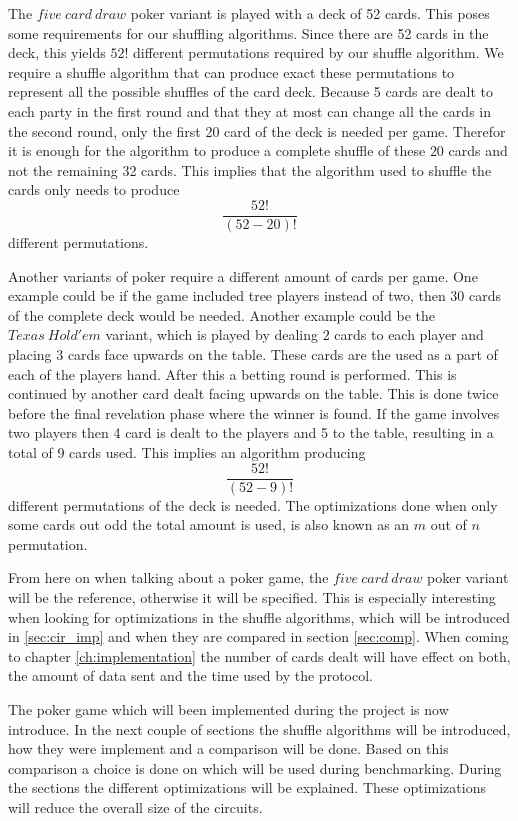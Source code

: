 \documentclass[twoside,11pt,openright]{report}
\begin{document}
The $five~card~draw$ poker variant is played with a deck of 52 cards. This poses some requirements for our shuffling algorithms. Since there are 52 cards in the deck, this yields $52!$ different permutations required by our shuffle algorithm. We require a shuffle algorithm that can produce exact these permutations to represent all the possible shuffles of the card deck. Because 5 cards are dealt to each party in the first round and that they at most can change all the cards in the second round, only the first 20 card of the deck is needed per game. Therefor it is enough for the algorithm to produce a complete shuffle of these $20$ cards and not the remaining 32 cards. This implies that the algorithm used to shuffle the cards only needs to produce $$\frac{52!}{(52-20)!}$$ different permutations. 

Another variants of poker require a different amount of cards per game. One example could be if the game included tree players instead of two, then 30 cards of the complete deck would be needed. Another example could be the $Texas~Hold'em$ variant, which is played by dealing $2$ cards to each player and placing $3$ cards face upwards on the table. These cards are the used as a part of each of the players hand. After this a betting round is performed. This is continued by another card dealt facing upwards on the table. This is done twice before the final revelation phase where the winner is found. If the game involves two players then 4 card is dealt to the players and 5 to the table, resulting in a total of 9 cards used. This implies an algorithm producing $$\frac{52!}{(52-9)!}$$ different permutations of the deck is needed. The optimizations done when only some cards out odd the total amount is used, is also known as an $m$ out of $n$ permutation.

From here on when talking about a poker game, the $five~card~draw$ poker variant will be the reference, otherwise it will be specified. This is especially interesting when looking for optimizations in the shuffle algorithms, which will be introduced in \ref{sec:cir_imp} and when they are compared in section \ref{sec:comp}. When coming to chapter \ref{ch:implementation} the number of cards dealt will have effect on both, the amount of data sent and the time used by the protocol.

\bigskip

The poker game which will been implemented during the project is now introduce. In the next couple of sections the shuffle algorithms will be introduced, how they were implement and a comparison will be done. Based on this comparison a choice is done on which will be used during benchmarking. During the sections the different optimizations will be explained. These optimizations will reduce the overall size of the circuits.
\end{document}

